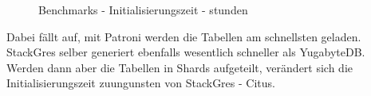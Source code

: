 \begin{flushleft}
\begin{figure}[H]
        \caption{Benchmarks - Initialisierungszeit - stunden}
        \label{fig:initializing_time_hour}
    \end{figure}
    Dabei fällt auf, mit Patroni werden die Tabellen am schnellsten geladen.\\
    StackGres selber generiert ebenfalls wesentlich schneller als YugabyteDB.\\
    Werden dann aber die Tabellen in Shards aufgeteilt, verändert sich die Initialisierungszeit zuungunsten von StackGres - Citus.
\end{flushleft}
